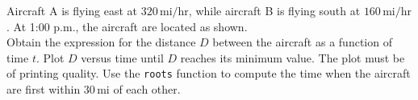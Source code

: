 \documentclass[a4paper, 12pt]{report}
\def\ni{blue!20!white}
\def\link{blue!50!black}
\begin{document}
    \newpage
    
    \begin{tcolorbox}[title={\color{black}{\section{Q10}}}, colback=white, colframe=\ni, boxrule=1mm, width=1\textwidth]    
        Aircraft A is flying east at \( 320 \, \text{mi/hr} \), while aircraft B is flying south at \( 160 \, \text{mi/hr} \). At 1:00 p.m., the aircraft are located as shown.\\[8pt]
        Obtain the expression for the distance \( D \) between the aircraft as a function of time \( t \). Plot \( D \) versus time until \( D \) reaches its minimum value. The plot must be of printing quality. Use the \texttt{roots} function to compute the time when the aircraft are first within \( 30 \, \text{mi} \) of each other.    
    \end{tcolorbox}
    
    
    \newpage
    
\end{document}
